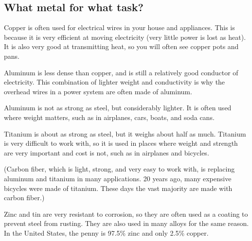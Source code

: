 \subsection{What metal for what task?}

Copper is often used for electrical wires in your house and
appliances. This is because it is very efficient at moving electricity (very
little power is lost as heat). It is also very good at transmitting
heat, so you will often see copper pots and pans.

Aluminum is less dense than copper, and is still a relatively good
conductor of electricity. This combination of lighter weight and conductivity is why the overhead wires in a power system
are often made of aluminum.

Aluminum is not as strong as steel, but considerably lighter. It is
often used where weight matters, such as in airplanes, cars, boats, and soda cans.

Titanium is about as strong as steel, but it weighs about half as
much. Titanium is very difficult to work with, so it is used in places
where weight and strength are very important and cost is not, such as in
airplanes and bicycles.

(Carbon fiber, which is light, strong, and very easy to work with, is
replacing aluminum and titanium in many applications. 20 years ago,
many expensive bicycles were made of titanium. These days the vast
majority are made with carbon fiber.)

Zinc and tin are very resistant to corrosion, so they are often used
as a coating to prevent steel from rusting. They are also used in many
alloys for the same reason.  In the United States, the penny is 97.5\%
zinc and only 2.5\% copper.

